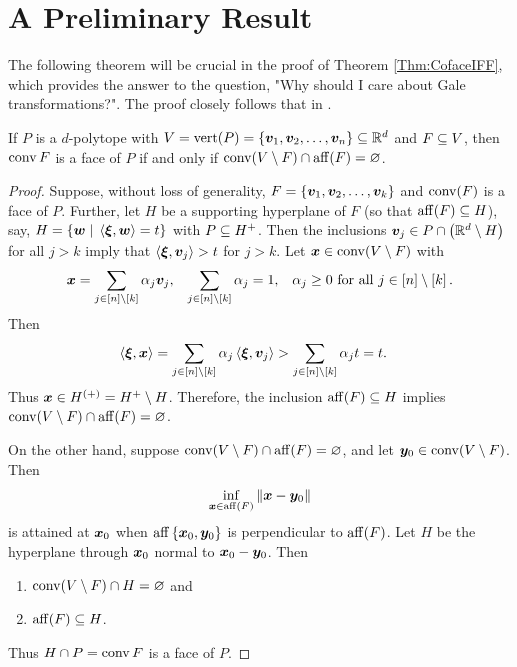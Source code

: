 \section{A Preliminary Result}\label{Sec:ConvAff}
    The following theorem will be crucial in the proof of Theorem \ref{Thm:CofaceIFF}, which provides the answer to the question, "Why should I care about Gale transformations?".  The proof closely follows that in \cite{Thomas}.
    \begin{Theorem}\label{Thm:ConvAff}
        If \(P\) is a \(d\)-polytope with \(V=\operatorname{vert}(P)=\left\{\bm{v}_1,\bm{v}_2,\dotsc,\bm{v}_n\right\}\subseteq\mathbb{R}^{d}\) and \(F\subseteq V\), then \(\operatorname{conv} F\) is a face of \(P\) if and only if \(\operatorname{conv}(V\setminus F)\cap\operatorname{aff}(F)=\varnothing\).
    \end{Theorem}
    \begin{proof}
        Suppose, without loss of generality, \(F=\left\{\bm{v}_1,\bm{v}_2,\dotsc,\bm{v}_k\right\}\) and \(\operatorname{conv}(F)\) is a face of \(P\).  Further, let \(H\) be a supporting hyperplane of \(F\) (so that \(\operatorname{aff}(F)\subseteq H\)), say, \(H=\setb{\ve w}{\ip{\ve\xi}{\ve w}=t}\) with \(P\subseteq H^+\).  Then the inclusions \(\bm{v}_j\in P\cap\left(\mathbb{R}^{d}\setminus H\right)\) for all \(j>k\) imply that \(\left\langle\bm{\xi},\bm{v}_j\right\rangle>t\) for \(j>k\).  Let \(\bm{x}\in\operatorname{conv}(V\setminus F)\) with
            \begin{align*}
                \bm{x}&=\sum_{j\in\left[n\right]\setminus\left[k\right]}\alpha_j\bm{v}_j,
                    &   \sum_{j\in\left[n\right]\setminus\left[k\right]}\alpha_j&=1,
                    &   \alpha_j\ge0\text{ for all }j\in\left[n\right]\setminus\left[k\right].
            \end{align*}
        Then
            \begin{align*}
                \left\langle\bm{\xi},\bm{x}\right\rangle
                    &=  \sum_{j\in\left[n\right]\setminus\left[k\right]}\alpha_j\left\langle\bm{\xi},\bm{v}_j\right\rangle
                    >   \sum_{j\in\left[n\right]\setminus\left[k\right]}\alpha_jt
                    =   t.
            \end{align*}
        Thus \(\bm{x}\in H^{(+)}=H^+\setminus H\).  Therefore, the inclusion \(\operatorname{aff}(F)\subseteq H\) implies \(\operatorname{conv}(V\setminus F)\cap\operatorname{aff}(F)=\varnothing\).

        On the other hand, suppose \(\operatorname{conv}(V\setminus F)\cap\operatorname{aff}(F)=\varnothing\), and let \(\bm{y}_0\in\operatorname{conv}(V\setminus F)\).  Then
            \[
                \inf_{\bm{x}\in\operatorname{aff}(F)}\left\lVert\bm{x}-\bm{y}_0\right\rVert
            \]
        is attained at \(\bm{x}_0\) when \(\operatorname{aff}\left\{\bm{x}_0,\bm{y}_0\right\}\) is perpendicular to \(\operatorname{aff}(F)\).  Let \(H\) be the hyperplane through \(\bm{x}_0\) normal to \(\bm{x}_0-\bm{y}_0\).  Then
            \begin{enumerate}
                \item   \(\operatorname{conv}(V\setminus F)\cap H=\varnothing\) and
                \item   \(\operatorname{aff}(F)\subseteq H\).
            \end{enumerate}
        Thus \(H\cap P=\operatorname{conv} F\) is a face of \(P\).
    \end{proof}

